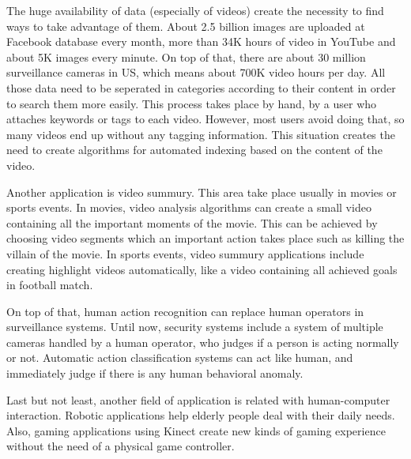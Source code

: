 \documentclass{report}
\begin{document}
The huge availability of data (especially of videos) create the  necessity to find ways to take advantage of them.
About 2.5 billion images are uploaded at Facebook database every month, more than 34K hours of video in YouTube and
about 5K images every minute. On top of that, there are about 30 million surveillance cameras in US, which means
about 700K video hours per day. All those data need to be seperated in categories according to their content in
order to search them more easily. This process takes place by hand, by a user who attaches
keywords or tags to each video. However, most users avoid doing that, so many videos end up without any tagging information.
This situation creates the need to create algorithms for automated indexing based on the content of the video.

Another application is video summury. This area take place usually in movies or sports events. In movies,
video analysis algorithms can create a small video containing all the important moments of the movie. This
can be achieved by choosing video segments which an important action takes place such as killing the villain
of the movie. In sports events, video summury applications include creating highlight videos automatically, like
a video containing all achieved goals in football match.

On top of that, human action recognition can replace human operators in surveillance systems. Until now,
security systems include a system of multiple cameras handled by a human operator, who judges if a person
is acting normally or not. Automatic action classification systems can act like human, and immediately
judge if there is any human behavioral anomaly.

Last but not least, another field of application is related with human-computer interaction. Robotic applications
help elderly people deal with their daily needs. Also, gaming applications using Kinect create new kinds of
gaming experience without the need of a physical game controller.
\end{document}
